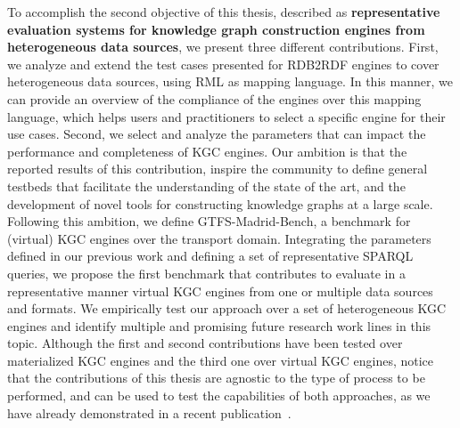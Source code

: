 To accomplish the second objective of this thesis, described as \textbf{representative evaluation systems for knowledge graph construction engines from heterogeneous data sources}, we present three different contributions. First, we analyze and extend the test cases presented for RDB2RDF engines to cover heterogeneous data sources, using RML as mapping language. In this manner, we can provide an overview of the compliance of the engines over this mapping language, which helps users and practitioners to select a specific engine for their use cases. Second, we select and analyze the parameters that can impact  the performance and completeness of KGC engines. Our ambition is that the reported results of this contribution, inspire the community to define general testbeds that facilitate the understanding of the state of the art, and the development of novel tools for constructing knowledge graphs at a large scale. Following this ambition, we define  GTFS-Madrid-Bench, a benchmark for (virtual) KGC engines over the transport domain. Integrating the parameters defined in our previous work and defining a set of representative SPARQL queries, we propose the first benchmark that contributes to evaluate in a representative manner virtual KGC engines from one or multiple data sources and formats. We empirically test our approach over a set of heterogeneous KGC engines and identify multiple and promising future research work lines in this topic. Although the first and second contributions have been tested over materialized KGC engines and the third one over virtual KGC engines, notice that the contributions of this thesis are agnostic to the type of process to be performed, and can be used to test the capabilities of both approaches, as we have already demonstrated in a recent publication~\citep{arenas2021knowledge}.


